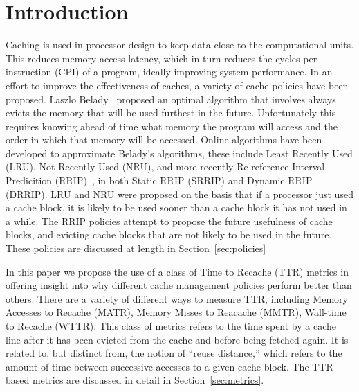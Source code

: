 \section{Introduction}
Caching is used in processor design to keep data close to the computational units.
This reduces memory access latency, which in turn reduces the cycles per instruction (CPI) of a program, ideally improving system performance.
In an effort to improve the effectiveness of caches, a variety of cache policies have been proposed.
Laszlo Belady~\cite{belady66} proposed an optimal algorithm that involves always evicts the memory that will be used furthest in the future.
Unfortunately this requires knowing ahead of time what memory the program will access and the order in which that memory will be accessed.
Online algorithms have been developed to approximate Belady's algorithms,
	these include Least Recently Used (LRU), Not Recently Used (NRU),
	and more recently Re-reference Interval Predicition (RRIP)~\cite{jaleeltheobald10},
	in both Static RRIP (SRRIP) and Dynamic RRIP (DRRIP).
LRU and NRU were proposed on the basis that if a processor just used a cache block,
	it is likely to be used sooner than a cache block it has not used in a while.
The RRIP policies attempt to propose the future usefulness of cache blocks,
	and evicting cache blocks that are not likely to be used in the future.
These policies are discussed at length in Section~\ref{sec:policies}

In this paper we propose the use of a class of Time to Recache (TTR) metrics in offering insight into why different cache management policies perform better than others.  
There are a variety of different ways to measure TTR, including Memory Accesses to Recache (MATR), Memory Misses to Reacache (MMTR), Wall-time to Recache (WTTR). 
This class of metrics refers to the time spent by a cache line after it has been evicted from the cache and before being fetched again.  
It is related to, but distinct from, the notion of ``reuse distance,'' which refers to the amount of time between successive accesses to a given cache block.
The TTR-based metrics are discussed in detail in Section~\ref{sec:metrics}.

